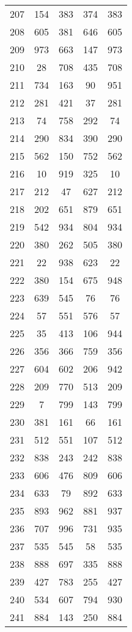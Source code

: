 \documentclass[a4paper,10pt,ngerman]{scrartcl}
\begin{document}
\begin{longtable}[c]{c|c|c|c|c}
    207 & 154 & 383 & 374 & 383 \\
    208 & 605 & 381 & 646 & 605 \\
    209 & 973 & 663 & 147 & 973 \\
    210 & 28 & 708 & 435 & 708 \\
    211 & 734 & 163 & 90 & 951 \\
    212 & 281 & 421 & 37 & 281 \\
    213 & 74 & 758 & 292 & 74 \\
    214 & 290 & 834 & 390 & 290 \\
    215 & 562 & 150 & 752 & 562 \\
    216 & 10 & 919 & 325 & 10 \\
    217 & 212 & 47 & 627 & 212 \\
    218 & 202 & 651 & 879 & 651 \\
    219 & 542 & 934 & 804 & 934 \\
    220 & 380 & 262 & 505 & 380 \\
    221 & 22 & 938 & 623 & 22 \\
    222 & 380 & 154 & 675 & 948 \\
    223 & 639 & 545 & 76 & 76 \\
    224 & 57 & 551 & 576 & 57 \\
    225 & 35 & 413 & 106 & 944 \\
    226 & 356 & 366 & 759 & 356 \\
    227 & 604 & 602 & 206 & 942 \\
    228 & 209 & 770 & 513 & 209 \\
    229 & 7 & 799 & 143 & 799 \\
    230 & 381 & 161 & 66 & 161 \\
    231 & 512 & 551 & 107 & 512 \\
    232 & 838 & 243 & 242 & 838 \\
    233 & 606 & 476 & 809 & 606 \\
    234 & 633 & 79 & 892 & 633 \\
    235 & 893 & 962 & 881 & 937 \\
    236 & 707 & 996 & 731 & 935 \\
    237 & 535 & 545 & 58 & 535 \\
    238 & 888 & 697 & 335 & 888 \\
    239 & 427 & 783 & 255 & 427 \\
    240 & 534 & 607 & 794 & 930 \\
    241 & 884 & 143 & 250 & 884 \\

\end{longtable}
\end{document}

